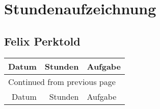 \chapter*{Stundenaufzeichnung}

\section*{Felix Perktold}
\label{sec:orgf3dc626}
\begin{longtable}{rrl}
\hline
Datum & Stunden & Aufgabe\\
\hline
\endfirsthead
\multicolumn{3}{l}{Continued from previous page} \\
\hline

Datum & Stunden & Aufgabe \\


\end{longtable}
